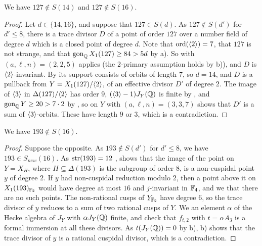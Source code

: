 \begin{proposition}\label{prop:127medium}
We have $127\notin S(14)$ and $127\notin S(16)$.
\end{proposition}

\begin{proof}
Let $d\in\{14,16\}$, and suppose that $127\in S(d)$. As $127\notin S(d')$ for $d'\leq 8$, there is a trace divisor $D$ of a point of order $127$ over a number field of degree $d$ which is a closed point of degree $d$. Note that $\operatorname{ord}(\langle 2\rangle)=7$, that $127$ is not strange, and that $\operatorname{gon}_{\mathbb{Q}} X_1(127)\geq84>5d$ by  a). So  with $(a,\ell,n)=(2,2,5)$ applies (the $2$-primary assumption holds by  b)), and $D$ is $\langle 2\rangle$-invariant. By  its support consists of orbits of length $7$, so $d=14$, and $D$ is a pullback from $Y=X_1(127)/\langle 2\rangle$, of an effective divisor $D'$ of degree $2$. The image of $\langle 3\rangle$ in $\Delta(127)/\langle 2\rangle$ has order $9$, $(\langle 3\rangle-1)J_Y(\mathbb{Q})$ is finite by , and $\operatorname{gon}_{\mathbb{Q}} Y\geq20>7\cdot2$ by , so  on $Y$ with $(a,\ell,n)=(3,3,7)$ shows that $D'$ is a sum of $\langle 3\rangle$-orbits. These have length $9$ or $3$, which is a contradiction.
\end{proof}

\begin{proposition}\label{prop:193}
We have $193\notin S(16)$.
\end{proposition}

\begin{proof}
Suppose the opposite. As $193\notin S(d')$ for $d'\leq 8$, we have $193\in S_{new}(16)$. As $\operatorname{str}(193)=12$ \cite[Table 2]{DSt},  shows that the image of the point on $Y=X_H$, where $H\subseteq\Delta(193)$ is the subgroup of order $8$, is a non-cuspidal point $y$ of degree $2$. If $y$ had non-cuspidal reduction modulo $2$, then a point above it on $X_1(193)_{\mathbb{F}_2}$ would have degree at most $16$ and $j$-invariant in $\mathbb{F}_4$, and we  that there are no such points. The non-rational cusps of $Y_{\mathbb{F}_2}$ have degree $6$, so the trace divisor of $y$ reduces to a sum of two rational cusps of $Y$. We  an element $\alpha$ of the Hecke algebra of $J_Y$ with $\alpha J_Y(\mathbb{Q})$ finite, and check that $f_{t,2}$ with $t=\alpha A_3$ is a formal immersion at all these divisors. As $t(J_Y(\mathbb{Q}))=0$ by  b),  b) shows that the trace divisor of $y$ is a rational cuspidal divisor, which is a contradiction.
\end{proof}

